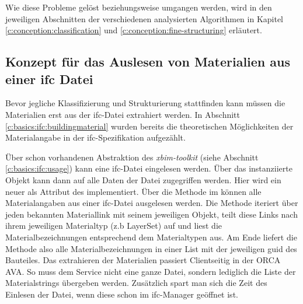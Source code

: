 Wie diese Probleme gelöst beziehungsweise umgangen werden, wird in den jeweiligen Abschnitten der verschiedenen analysierten Algorithmen in Kapitel \ref{c:conception:classification} und \ref{c:conception:fine-structuring} erläutert.

\subsection{Konzept für das Auslesen von Materialien aus einer \ac{ifc} Datei}
\label{c:conception:architecture:ifc-material-extraction}
Bevor jegliche Klassifizierung und Strukturierung stattfinden kann müssen die Materialien erst aus der \ac{ifc}-Datei extrahiert werden. In Abschnitt \ref{c:basics:ifc:buildingmaterial} wurden bereits die theoretischen Möglichkeiten der Materialangabe in der \ac{ifc}-Spezifikation aufgezählt.

Über schon vorhandenen Abstraktion des \textit{xbim-toolkit} (siehe Abschnitt \ref{c:basics:ifc:usage}) kann eine \ac{ifc}-Datei eingelesen werden. Über das instanziierte Objekt  kann dann auf alle Daten der Datei zugegriffen werden. Hier wird ein neuer  als Attribut des  implementiert. Über die Methode  im  können alle Materialangaben aus einer \ac{ifc}-Datei ausgelesen werden. Die Methode iteriert über jeden bekannten Materiallink mit seinem jeweiligen Objekt, teilt diese Links nach ihrem jeweiligen Materialtyp (z.b LayerSet) auf und liest die Materialbezeichnungen entsprechend dem Materialtypen aus. Am Ende liefert die Methode also alle Materialbezeichnungen in einer List mit der jeweiligen \ac{guid} des Bauteiles.
Das extrahieren der Materialien passiert Clientseitig in der ORCA AVA. So muss dem Service nicht eine ganze Datei, sondern lediglich die Liste der Materialstrings übergeben werden. Zusätzlich spart man sich die Zeit des Einlesen der Datei, wenn diese schon im \ac{ifc}-Manager geöffnet ist.

